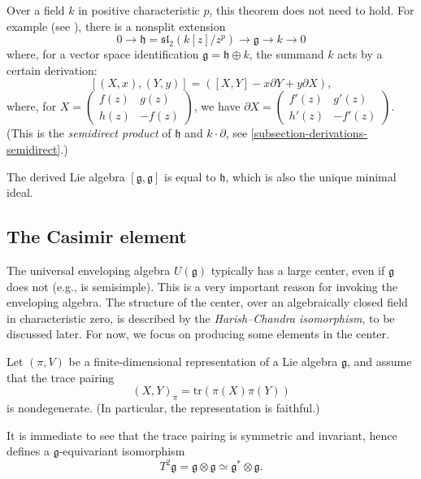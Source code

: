 \begin{remark}
 \label{remark-notsimplesum-positivechar}
Over a field $k$ in positive characteristic $p$, this theorem does not need to hold. For example (see \cite[\S 2.4]{Rumynin}), there is a nonsplit extension 
$$ 0 \to \mathfrak h = \mathfrak{sl}_2(k[z]/z^p) \to \mathfrak g \to k \to 0$$
where, for a vector space identification $\mathfrak g = \mathfrak h \oplus k$, the summand $k$ acts by a certain derivation:
$$ [(X,x), (Y,y)] = ([X,Y] - x \partial Y + y\partial X),$$
where, for $X = \begin{pmatrix} f(z) & g(z) \\ h(z) & -f(z)\end{pmatrix}$, we have $\partial X = \begin{pmatrix} f'(z) & g'(z) \\ h'(z) & -f'(z)\end{pmatrix}$. (This is the \emph{semidirect product} of $\mathfrak h$ and $k\cdot \partial$, see \ref{subsection-derivations-semidirect}.) 

The derived Lie algebra $[\mathfrak g, \mathfrak g]$ is equal to $\mathfrak h$, which is also the unique minimal ideal.
\end{remark}




\subsection{The Casimir element} 
\label{subsection-Casimir}

The universal enveloping algebra $U(\mathfrak g)$ typically has a large center, even if $\mathfrak g$ does not (e.g., is semisimple). This is a very important reason for invoking the enveloping algebra. The structure of the center, over an algebraically closed field in characteristic zero, is described by the \emph{Harish--Chandra isomorphism}, to be discussed later. For now, we focus on producing some elements in the center. 

Let $(\pi, V)$ be a finite-dimensional representation of a Lie algebra $\mathfrak g$, and assume that the trace pairing 
$$ (X, Y)_\pi = \text{tr}(\pi(X)\pi(Y))$$
is nondegenerate. (In particular, the representation is faithful.)

It is immediate to see that the trace pairing is symmetric and invariant, hence defines a $\mathfrak g$-equivariant isomorphism 
$$ T^2\mathfrak g = \mathfrak g \otimes \mathfrak g \simeq \mathfrak g^*\otimes \mathfrak g.$$



